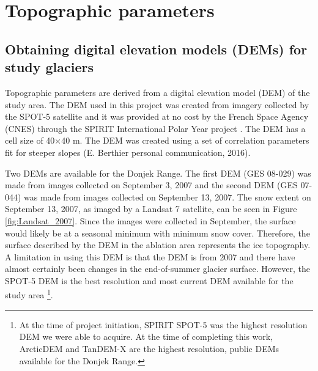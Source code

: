 \documentclass{sfuthesis}
\begin{document}
\section{Topographic parameters}

\subsection{Obtaining digital elevation models (DEMs) for study glaciers}

Topographic parameters are derived from a digital elevation model (DEM) of the study area. The DEM used in this project was created from imagery collected by the SPOT-5 satellite and it was provided at no cost by the French Space Agency (CNES) through the SPIRIT International Polar Year project \citep{Korona2009}. The DEM has a cell size of 40$\times$40 m. The DEM was created using a set of correlation parameters fit for steeper slopes (E. Berthier personal communication, 2016). 

Two DEMs are available for the Donjek Range. The first DEM (GES 08-029) was made from images collected on September 3, 2007 and the second DEM (GES 07-044) was made from images collected on September 13, 2007. The snow extent on September 13, 2007, as imaged by a Landsat 7 satellite, can be seen in Figure \ref{fig:Landsat_2007}. Since the images were collected in September, the surface would likely be at a seasonal minimum with minimum snow cover. Therefore, the surface described by the DEM in the ablation area represents the ice topography. A limitation in using this DEM is that the DEM is from 2007 and there have almost certainly been changes in the end-of-summer glacier surface. However, the SPOT-5 DEM is the best resolution and most current DEM available for the study area \footnote{At the time of project initiation, SPIRIT SPOT-5 was the highest resolution DEM we were able to acquire. At the time of completing this work, ArcticDEM and TanDEM-X are the highest resolution, public DEMs available for the Donjek Range.}. 
\end{document}
